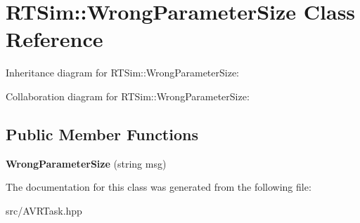 \hypertarget{classRTSim_1_1WrongParameterSize}{}\section{R\+T\+Sim\+:\+:Wrong\+Parameter\+Size Class Reference}
\label{classRTSim_1_1WrongParameterSize}


Inheritance diagram for R\+T\+Sim\+:\+:Wrong\+Parameter\+Size\+:


Collaboration diagram for R\+T\+Sim\+:\+:Wrong\+Parameter\+Size\+:
\subsection*{Public Member Functions}
\begin{DoxyCompactItemize}
\item 
{\bfseries Wrong\+Parameter\+Size} (string msg)\hypertarget{classRTSim_1_1WrongParameterSize_a25d74070dfcad05e2ab20407671d794b}{}\label{classRTSim_1_1WrongParameterSize_a25d74070dfcad05e2ab20407671d794b}

\end{DoxyCompactItemize}


The documentation for this class was generated from the following file\+:\begin{DoxyCompactItemize}
\item 
src/A\+V\+R\+Task.\+hpp\end{DoxyCompactItemize}
